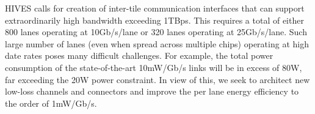 \noindent
HIVES calls for creation of inter-tile communication interfaces that can support extraordinarily high bandwidth exceeding 1TBps.
This requires a total of either 800 lanes operating at 10Gb/s/lane or 320 lanes operating at 25Gb/s/lane.  
Such large number of lanes (even when spread across multiple chips) operating at high date rates poses many difficult challenges. 
For example, the total power consumption of the state-of-the-art 10mW/Gb/s links will be in excess of 80W, 
far exceeding the 20W power constraint.
In view of this, we seek to architect new low-loss channels and connectors and improve the per lane energy efficiency to the order of 1mW/Gb/s. 


